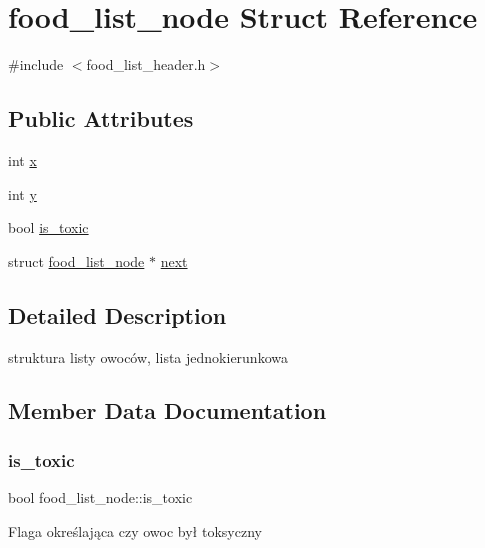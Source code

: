 \hypertarget{structfood__list__node}{}\section{food\+\_\+list\+\_\+node Struct Reference}
\label{structfood__list__node}


{\ttfamily \#include $<$food\+\_\+list\+\_\+header.\+h$>$}

\subsection*{Public Attributes}
\begin{DoxyCompactItemize}
\item 
int \mbox{\hyperlink{structfood__list__node_ab0daddf2204f2cef5744b94e027d7eda}{x}}
\item 
int \mbox{\hyperlink{structfood__list__node_a4e7687a6c9c4024e19508dd824dbb0f5}{y}}
\item 
bool \mbox{\hyperlink{structfood__list__node_a76f1ab00feec2593cfd4d944cb308b03}{is\+\_\+toxic}}
\item 
struct \mbox{\hyperlink{structfood__list__node}{food\+\_\+list\+\_\+node}} $\ast$ \mbox{\hyperlink{structfood__list__node_a5d37d39ebff1f55508b5fd78afd294a3}{next}}
\end{DoxyCompactItemize}


\subsection{Detailed Description}
struktura listy owoców, lista jednokierunkowa 

\subsection{Member Data Documentation}
\mbox{\label{structfood__list__node_a76f1ab00feec2593cfd4d944cb308b03}} 
\subsubsection{\texorpdfstring{is\_toxic}{is\_toxic}}
{\footnotesize\ttfamily bool food\+\_\+list\+\_\+node\+::is\+\_\+toxic}

Flaga określająca czy owoc był toksyczny \mbox{\label{structfood__list__node_a5d37d39ebff1f55508b5fd78afd294a3}} 
